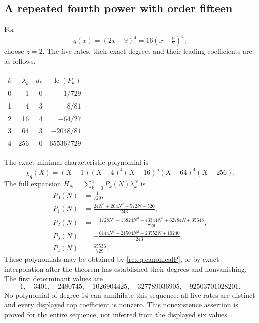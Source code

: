 \documentclass[11pt,a4paper]{article}
\numberwithin{equation}{section}
\theoremstyle{definition}
\theoremstyle{remark}
\newcommand{\lc}{\operatorname{lc}}
\begin{document}
\subsection{A repeated fourth power with order fifteen}
For
\begin{equation}\label{rc:eq:qexample}
 q(x)=(2x-9)^4=16(x-\tfrac92)^4,
\end{equation}
choose $z=2$.  The five rates, their exact degrees and their leading
coefficients are as follows.
\begin{center}
\renewcommand{\arraystretch}{1.18}
\begin{tabular}{@{}rrrr@{}}
\toprule
$k$ & $\lambda_k$ & $d_k$ & $\lc(P_k)$\\
\midrule
0 & 1   & 0 & $1/729$\\
1 & 4   & 3 & $8/81$\\
2 & 16  & 4 & $-64/27$\\
3 & 64  & 3 & $-2048/81$\\
4 & 256 & 0 & $65536/729$\\
\bottomrule
\end{tabular}
\end{center}
The exact minimal characteristic polynomial is
\begin{equation}\label{rc:eq:chi15}
 \chi_q(X)=(X-1)(X-4)^4(X-16)^5(X-64)^4(X-256).
\end{equation}
The full expansion $H_N=\sum_{k=0}^{4}P_k(N)\lambda_k^N$ is
\begin{align}
 P_0(N)&=\frac1{729},\nonumber\\
 P_1(N)&=\frac{24N^3+204N^2+572N+520}{243},\nonumber\\
 P_2(N)&=-\frac{1728N^4+13824N^3+43344N^2+62784N+35648}{729},
                    \label{rc:eq:examplepolys}\\
 P_3(N)&=-\frac{6144N^3+21504N^2+23552N+10240}{243},\nonumber\\
 P_4(N)&=\frac{65536}{729}.\nonumber
\end{align}
These polynomials may be obtained by \eqref{rc:eq:canonicalP}, or by exact
interpolation after the theorem has established their degrees and
nonvanishing.  The first determinant values are
\[
 1,\quad3401,\quad2480745,\quad1026904425,\quad
 327789036905,\quad92503701028201.
\]
No polynomial of degree $14$ can annihilate this sequence: all five
rates are distinct and every displayed top coefficient is nonzero.
This nonexistence assertion is proved for the entire sequence, not
inferred from the displayed six values.
\end{document}
